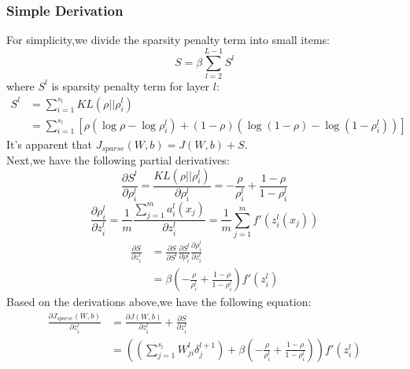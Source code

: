 \documentclass{beamer}
\begin{document}
\begin{CJK*}{UTF8}{gbsn}
\begin{frame}[allowframebreaks]\frametitle{Simple Derivation}
For simplicity,we divide the sparsity penalty term into small items:
\begin{equation}
S=\beta\sum_{l=2}^{L-1}S^l
\end{equation}
where $S^l$ is sparsity penalty term for layer $l$:
\begin{equation}
\begin{split}
S^l&=\sum_{i=1}^{s_l}KL(\rho||\rho_i^l)\\
&=\sum_{i=1}^{s_l}\left[\rho(\log\rho-\log\rho_i^l)+(1-\rho)(\log(1-\rho)-\log(1-\rho_i^l))\right]
\end{split}
\end{equation}
It's apparent that $J_{sparse}(W,b)=J(W,b)+S$.\\
Next,we have the following partial derivatives:
\begin{equation}
\frac{\partial S^l}{\partial\rho_i^l}=\frac{KL(\rho||\rho_i^l)}{\partial\rho_i^l}=-\frac{\rho}{\rho_i^l}+\frac{1-\rho}{1-\rho_i^l}
\end{equation}
\begin{equation}
\frac{\partial\rho_i^l}{\partial z_i^l}=\frac{1}{m}\frac{\sum_{j=1}^m a_i^l(x_j)}{\partial z_i^l}=\frac{1}{m}\sum_{j=1}^m f'(z_i^l(x_j))
\end{equation}
\begin{equation}
\begin{split}
\frac{\partial S}{\partial z_i^l}&=\frac{\partial S}{\partial S^l}\frac{\partial S^l}{\partial\rho_i^l}\frac{\partial\rho_i^l}{\partial z_i^l}\\
&=\beta\left(-\frac{\rho}{\rho_i^l}+\frac{1-\rho}{1-\rho_i^l}\right)f'(z_i^l)
\end{split}
\end{equation}
Based on the derivations above,we have the following equation:
\begin{equation}
\begin{split}
\frac{\partial J_{sparse}(W,b)}{\partial z_i^l}&=\frac{\partial J(W,b)}{\partial z_i^l}+\frac{\partial S}{\partial z_i^l}\\
&=\left(\left(\sum_{j=1}^{s_l}W_{ji}^l\delta_j^{l+1}\right)+\beta\left(-\frac{\rho}{\rho_i^l}+\frac{1-\rho}{1-\rho_i^l}\right)\right)f'(z_i^l)
\end{split}
\end{equation}
\end{frame}

\end{CJK*}
\end{document}
